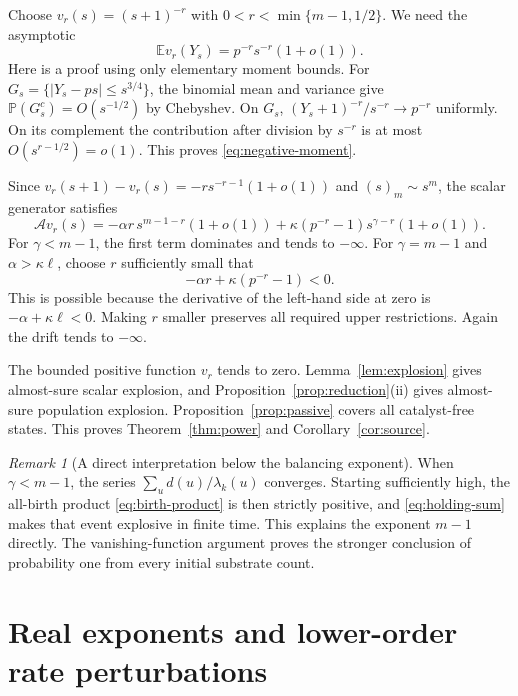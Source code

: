 \documentclass[11pt,a4paper]{article}
\theoremstyle{remark}\newtheorem{remark}[theorem]{Remark}
\newcommand{\E}{\mathbb E}
\newcommand{\Prob}{\mathbb P}
\newcommand{\A}{\mathcal A}
\begin{document}
Choose $v_r(s)=(s+1)^{-r}$ with $0<r<\min\{m-1,1/2\}$. We need the asymptotic
\begin{equation}\label{eq:negative-moment}
\E v_r(Y_s)=p^{-r}s^{-r}(1+o(1)).
\end{equation}
Here is a proof using only elementary moment bounds. For
$G_s=\{|Y_s-ps|\le s^{3/4}\}$, the binomial mean and variance give
$\Prob(G_s^c)=O(s^{-1/2})$ by Chebyshev. On $G_s$,
$(Y_s+1)^{-r}/s^{-r}\to p^{-r}$ uniformly. On its complement the contribution after division by $s^{-r}$ is at most $O(s^{r-1/2})=o(1)$. This proves \eqref{eq:negative-moment}.

Since $v_r(s+1)-v_r(s)=-rs^{-r-1}(1+o(1))$ and $(s)_m\sim s^m$, the scalar generator satisfies
\begin{equation}\label{eq:power-drift}
\A v_r(s)
=-\alpha r\,s^{m-1-r}(1+o(1))
+\kappa(p^{-r}-1)s^{\gamma-r}(1+o(1)).
\end{equation}
For $\gamma<m-1$, the first term dominates and tends to $-\infty$. For $\gamma=m-1$ and $\alpha>\kappa\ell$, choose $r$ sufficiently small that
\begin{equation}\label{eq:r-choice}
-\alpha r+\kappa(p^{-r}-1)<0.
\end{equation}
This is possible because the derivative of the left-hand side at zero is $-\alpha+\kappa\ell<0$. Making $r$ smaller preserves all required upper restrictions. Again the drift tends to $-\infty$.

The bounded positive function $v_r$ tends to zero. Lemma~\ref{lem:explosion} gives almost-sure scalar explosion, and Proposition~\ref{prop:reduction}(ii) gives almost-sure population explosion. Proposition~\ref{prop:passive} covers all catalyst-free states. This proves Theorem~\ref{thm:power} and Corollary~\ref{cor:source}.

\begin{remark}[A direct interpretation below the balancing exponent]
When $\gamma<m-1$, the series $\sum_u d(u)/\lambda_k(u)$ converges. Starting sufficiently high, the all-birth product \eqref{eq:birth-product} is then strictly positive, and \eqref{eq:holding-sum} makes that event explosive in finite time. This explains the exponent $m-1$ directly. The vanishing-function argument proves the stronger conclusion of probability one from every initial substrate count.
\end{remark}

\section{Real exponents and lower-order rate perturbations}\label{sec:robust}
\end{document}
